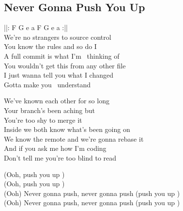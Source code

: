 \subsection{Never Gonna Push You Up}

\textcolor{\chordcolor}{||: F G e a F G e a :||} \\

 We're no strangers to source control \\
 You know the rules and so do I \\
 A full commit is what I'm  \ thinking of \\
 You wouldn't get this from any other file \\
 I just wanna tell you what I changed \\
 Gotta make you  \ understand \\


We've known each other for so long \\
Your branch's been aching but \\
You're too shy to merge it \\
Inside we both know what's been going on \\
We know the remote and we're gonna rebase it \\
And if you ask me how I'm coding \\
Don't tell me you're too blind to read \\


(Ooh, push you up ) \\
(Ooh, push you up ) \\
(Ooh) Never gonna push, never gonna push (push you up ) \\
(Ooh) Never gonna push, never gonna push (push you up ) \\

